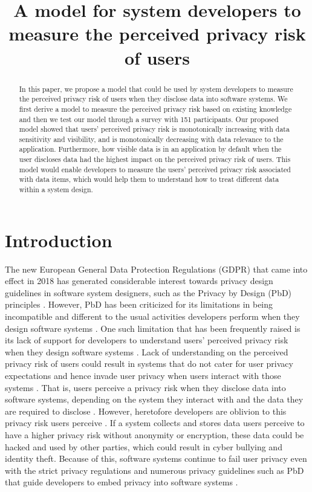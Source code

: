 \documentclass[10pt]{article}
\title{A model for system developers to measure the perceived privacy risk of users}
\date{}
\begin{document}
\maketitle
\begin{abstract}
In this paper, we propose a model that could be used by system developers to measure the perceived privacy risk of users when they disclose data into software systems. We first derive a model to measure the perceived privacy risk based on existing knowledge and then we test our model through a survey with 151 participants. Our proposed model showed that users' perceived privacy risk is monotonically increasing with data sensitivity and visibility, and is monotonically decreasing with data relevance to the application. Furthermore, how visible data is in an application by default when the user discloses data had the highest impact on the perceived privacy risk of users. This model would enable developers to measure the users' perceived privacy risk associated with data items, which would help them to understand how to treat different data within a system design.
\end{abstract}



\section{Introduction}
The new European General Data Protection Regulations (GDPR) that came into effect in 2018 has generated considerable interest towards privacy design guidelines in software system designers, such as the Privacy by Design (PbD) principles \cite {wagner2016national}. However, PbD has been criticized for its limitations in being incompatible and different to the usual activities developers perform when they design software systems \cite {senarath2017designing, ayalon2018crowdsourcing}. One such limitation that has been frequently raised is its lack of support for developers to understand users' perceived privacy risk when they design software systems \cite {ayalon2018crowdsourcing}. Lack of understanding on the perceived privacy risk of users could result in systems that do not cater for user privacy expectations and hence invade user privacy when users interact with those systems \cite {senarath2018why}. That is, users perceive a privacy risk when they disclose data into software systems, depending on the system they interact with and the data they are required to disclose \cite {malheiros2013fairly}. However, heretofore developers are oblivion to this privacy risk users perceive \cite {senarath2018under, oetzel2014systematic, senarath2018why}. If a system collects and stores data users perceive to have a higher privacy risk without anonymity or encryption, these data could be hacked and used by other parties, which could result in cyber bullying and identity theft. Because of this, software systems continue to fail user privacy even with the strict privacy regulations \cite {wagner2016national} and numerous privacy guidelines such as PbD that guide developers to embed privacy into software systems \cite {senarath2018why}.
\end{document}
